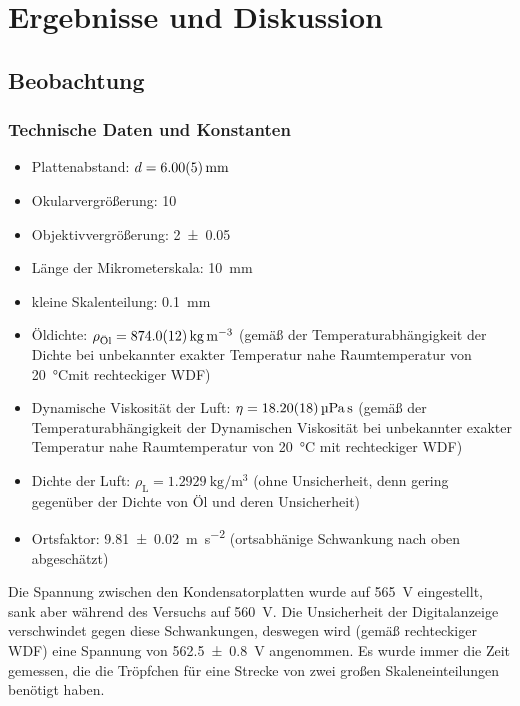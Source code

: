 \documentclass[
	a4paper,
	12pt,
	pagesize,
	ngerman
]{scrartcl}
\begin{document}
	
	\section{Ergebnisse und Diskussion}
	

	\subsection{Beobachtung}
	\subsubsection*{Technische Daten und Konstanten} %
	\begin{itemize}
		\item Plattenabstand: $d=\SI{6 \pm 0,05}{mm}$
		\item Okularvergrößerung: 10
		\item Objektivvergrößerung: \SI{2 \pm 0,05}{}
		\item Länge der Mikrometerskala: \SI{10}{mm}
		\item kleine Skalenteilung: \SI{0,1}{mm}
		\item Öldichte: $\rho_\text{Öl} = \SI{874 \pm 1,2}{\kilogram \per \metre \cubed} $ (gemäß der Temperaturabhängigkeit der Dichte bei unbekannter exakter Temperatur nahe Raumtemperatur von \SI{20}{\degreeCelsius}mit rechteckiger WDF)
		\item Dynamische Viskosität der Luft: $\eta = \SI{18,2 \pm 0,18}{\micro \pascal \second} $ (gemäß der Temperaturabhängigkeit der Dynamischen Viskosität bei unbekannter exakter Temperatur nahe Raumtemperatur von \SI{20}{\degreeCelsius} mit rechteckiger WDF)
		\item Dichte der Luft: $\rho_\text{L}= \SI{1,2929}{\kilogram \per \metre \cubed}$ (ohne Unsicherheit, denn gering gegenüber der Dichte von Öl und deren Unsicherheit)
		\item Ortsfaktor: \SI{9,81 \pm 0,02}{\meter \per \second \squared} (ortsabhänige Schwankung nach oben abgeschätzt)
	\end{itemize}
	Die Spannung zwischen den Kondensatorplatten wurde auf \SI{565}{V} eingestellt, sank aber während des Versuchs auf \SI{560}{V}.
	Die Unsicherheit der Digitalanzeige verschwindet gegen diese Schwankungen, deswegen wird (gemäß rechteckiger WDF) eine Spannung von \SI{562,5 \pm 0,8}{V} angenommen.
	Es wurde immer die Zeit gemessen, die die Tröpfchen für eine Strecke von zwei großen Skaleneinteilungen benötigt haben.
\end{document}
